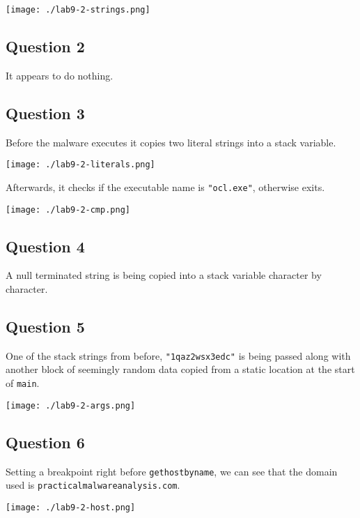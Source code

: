 \documentclass[11pt]{article}
\begin{document}
\begin{center}
\texttt{[image: ./lab9-2-strings.png]}
\end{center}
\subsection{Question 2}
\label{sec:orge42f966}
It appears to do nothing.
\subsection{Question 3}
\label{sec:org3a31948}
Before the malware executes it copies two literal strings into a stack variable.

\begin{center}
\texttt{[image: ./lab9-2-literals.png]}
\end{center}

Afterwards, it checks if the executable name is \texttt{"ocl.exe"}, otherwise
exits.

\begin{center}
\texttt{[image: ./lab9-2-cmp.png]}
\end{center}
\subsection{Question 4}
\label{sec:orga179051}
A null terminated string is being copied into a stack variable
character by character.
\subsection{Question 5}
\label{sec:org29229ee}
One of the stack strings from before, \texttt{"1qaz2wsx3edc"} is being passed
along with another block of seemingly random data copied from a static
location at the start of \texttt{main}.

\begin{center}
\texttt{[image: ./lab9-2-args.png]}
\end{center}
\subsection{Question 6}
\label{sec:org3726b8b}
Setting a breakpoint right before \texttt{gethostbyname}, we can see that the
domain used is \texttt{practicalmalwareanalysis.com}.

\begin{center}
\texttt{[image: ./lab9-2-host.png]}
\end{center}
\end{document}

